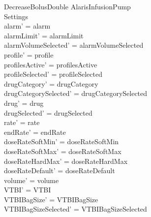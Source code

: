 \begin{schema}{DecreaseBolusDouble}
	\Delta AlarisInfusionPump\\
	Settings\\
	\where
	alarm' = alarm\\
	alarmLimit' = alarmLimit\\
	alarmVolumeSelected' = alarmVolumeSelected\\
	profile' = profile\\
	profilesActive' = profilesActive\\  
	  profileSelected' = profileSelected\\
	drugCategory' = drugCategory\\ drugCategorySelected' = drugCategorySelected\\
	drug' = drug\\ drugSelected' = drugSelected\\
	rate' = rate\\
	endRate' = endRate\\
	doseRateSoftMin' = doseRateSoftMin\\
	doseRateSoftMax' = doseRateSoftMax\\
	doseRateHardMax' = doseRateHardMax\\
	\pagebreak
	doseRateDefault' = doseRateDefault\\
	volume' = volume\\
	VTBI' = VTBI\\
	VTBIBagSize' = VTBIBagSize\\ VTBIBagSizeSelected' = VTBIBagSizeSelected\\

\end{schema}
